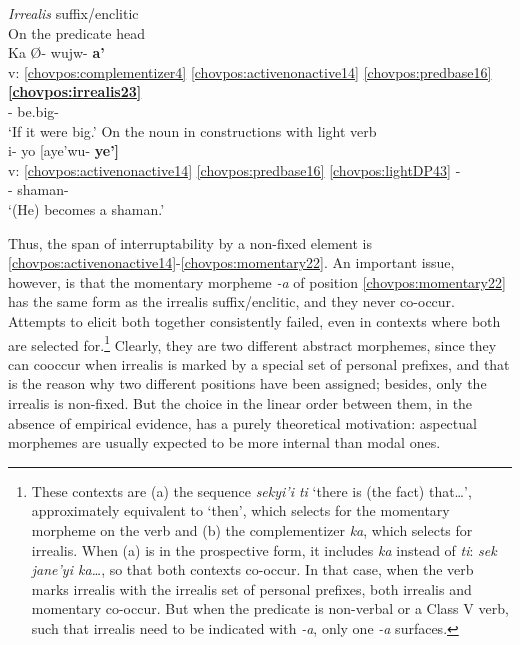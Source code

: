 \documentclass[output=paper]{langscibook}
\begin{document}
\ea\label{bkm:Ref90043129}\textit{Irrealis} suffix/enclitic\\ 
    \ea\label{bkm:Ref84285967} On the predicate head \\ {
    \glll {} Ka Ø{}- wujw- \textbf{a'}\\ 
    v: \ref{chovpos:complementizer4} \ref{chovpos:activenonactive14} \ref{chovpos:predbase16} \textbf{\ref{chovpos:irrealis23}}\\ 
    {} \Comp{} \Third{}- be.big- \textbf{\Irr{}}\\
    \glt `If it were big.'
    }
    \ex\label{bkm:Ref84285943}On the noun in constructions with light verb \\ {
    \glll {} i- yo [aye'wu- \textbf{ye']} \\ 
    v: \ref{chovpos:activenonactive14} \ref{chovpos:predbase16} \ref{chovpos:lightDP43} - \\ 
    {} \Third{}- \Lv{} shaman- \textbf{\Irr{}} \\
    \glt `(He) becomes a shaman.'
    }
    \z 
\z 

Thus, the span of interruptability by a non-fixed element is \ref{chovpos:activenonactive14}{}-\ref{chovpos:momentary22}. An important issue, however, is that the momentary morpheme \textit{-a} of position \ref{chovpos:momentary22} has the same form as the irrealis suffix/enclitic, and they never co-occur. Attempts to elicit both together consistently failed, even in contexts where both are selected for.\footnote{These contexts are (a) the sequence \textit{sekyi'i ti} `there is (the fact) that…', approximately equivalent to `then', which selects for the momentary morpheme on the verb and (b) the complementizer \textit{ka}, which selects for irrealis. When (a) is in the prospective form, it includes \textit{ka} instead of \textit{ti}: \textit{sek jane'yi ka…}, so that both contexts co-occur. In that case, when the verb marks irrealis with the irrealis set of personal prefixes, both irrealis and momentary co-occur. But when the predicate is non-verbal or a Class V verb, such that irrealis need to be indicated with \textit{-a}, only one \textit{-a} surfaces.} Clearly, they are two different abstract morphemes, since they can cooccur when irrealis is marked by a special set of personal prefixes, and that is the reason why two different positions have been assigned; besides, only the irrealis is non-fixed. But the choice in the linear order between them, in the absence of empirical evidence, has a purely theoretical motivation: aspectual morphemes are usually expected to be more internal than modal ones.
\end{document}

